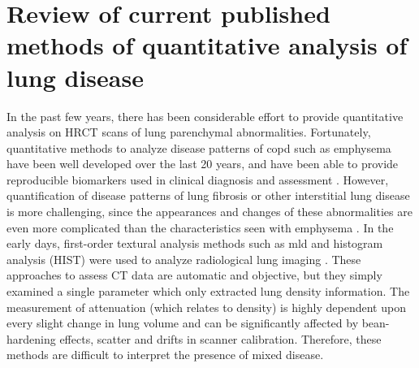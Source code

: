 \section{Review of current published methods of quantitative analysis of lung disease} \label{Review}
In the past few years, there has been considerable effort to provide quantitative analysis on HRCT scans of lung parenchymal abnormalities. Fortunately, quantitative methods to analyze disease patterns of \gls{copd} such as emphysema have been well developed over the last 20 years, and have been able to provide reproducible biomarkers used in clinical diagnosis and assessment \citep{da2008identification,gietema2011quantifying,galban2012computed,wang2013high,castaldi2013distinct}. However, quantification of disease patterns of lung fibrosis or other interstitial lung disease is more challenging, since the appearances and changes of these abnormalities are even more complicated than the characteristics seen with emphysema \citep{lynch2007quantitative, delorme1997usual, galban2012computed, depeursinge2010comparative}. In the early days, first-order textural analysis methods such as \gls{mld} and histogram analysis (HIST) were used to analyze radiological lung imaging \citep{gilman1983ct,gould1988ct,muller1988density,kinsella1990quantitation,knudson1991expiratory,behr1992evaluation}. These approaches to assess CT data are automatic and objective, but they simply examined a single parameter which only extracted lung density information. The measurement of attenuation (which relates to density) is highly dependent upon every slight change in lung volume and can be significantly affected by bean-hardening effects, scatter and drifts in scanner calibration. Therefore, these methods are difficult to interpret the presence of mixed disease.

